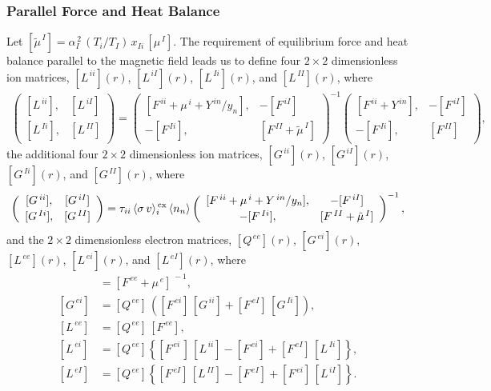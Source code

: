 \documentclass[12pt,prb,aps]{revtex4-1}
\begin{document}
\subsubsection{Parallel Force and Heat Balance}\label{sbalance}
Let
$[\tilde{\mu}^{\,I}] =\alpha_I^{\,2}\,(T_i/T_I)\,x_{Ii}\,[\mu^{\,I}]$.
The requirement of equilibrium force and heat balance parallel to the magnetic field leads us to define
four $2\times 2$  dimensionless ion matrices, $[L^{\,ii}](r)$, $[L^{\,iI}](r)$, $[L^{\,Ii}](r)$, and $[L^{\,II}](r)$,
where\,\cite{sigmar}
\begin{align}
\left(\begin{array}{cc} [L^{\,ii}], & [L^{\,iI}]\\[0.5ex] [L^{\,Ii}],& [L^{\,II}]\end{array}\right)=
\left(\begin{array}{cc}[F^{\,ii}+\mu^{\,i}+ Y^{\,in}/y_n], & -[F^{\,iI}]\\[0.5ex] -[F^{\,Ii}], & [F^{\,II}+\tilde{\mu}^{\,I}]\end{array}\right)^{-1}
\left(\begin{array}{cc} [F^{\,ii}+Y^{\,in}], & -[F^{\,iI}]\\[0.5ex] -[F^{\,Ii}], & [F^{\,II}]\end{array}\right),
\end{align}
the additional  four $2\times 2$  dimensionless ion matrices, $[G^{\,ii}](r)$, $[G^{\,iI}](r)$, $[G^{\,Ii}](r)$, and $[G^{\,II}](r)$,
where
\begin{align}
\left(\begin{array}{cc} [G^{\,ii}], & [G^{\,iI}]\\[0.5ex] [G^{\,Ii}],& [G^{\,II}]\end{array}\right)=\tau_{ii}\,\langle \sigma\,v\rangle_i^{\,\rm cx}
\,\langle n_n\rangle
\left(\begin{array}{cc}[F^{\,ii}+\mu^{\,i}+ Y^{\,in}/y_n], & -[F^{\,iI}]\\[0.5ex] -[F^{\,Ii}], & [F^{\,II}+\tilde{\mu}^{\,I}]\end{array}\right)^{-1},
\end{align}
and the $2\times 2$ dimensionless electron matrices, $[Q^{\,ee}](r)$, $[G^{\,ei}](r)$, $[L^{\,ee}](r)$, $[L^{\,ei}](r)$, 
and $[L^{\,eI}](r)$, 
where
\begin{align}
[Q^{\,ee}]&= [F^{\,ee}+\mu^{\,e}]^{\,-1},\\[0.5ex]
[G^{\,ei}] &= [Q^{\,ee}]\,([F^{\,ei}]\,[G^{\,ii}]+ [F^{\,eI}]\,[G^{\,Ii}]),\\[0.5ex]
[L^{\,ee}] &= [Q^{\,ee}]\,[F^{\,ee}],\\[0.5ex]
[L^{\,ei}] &= [Q^{\,ee}]\left\{[F^{\,ei}\,]\,[L^{\,ii}]-[F^{\,ei}]+[F^{\,eI}]\,[L^{\,Ii}]\right\},\\[0.5ex]
[L^{\,eI}] &= [Q^{\,ee}]\left\{[F^{\,eI}]\,[L^{\,II}]-[F^{\,eI}]+[F^{\,ei}]\,[L^{\,iI}]\right\}.
\end{align}
\end{document}

